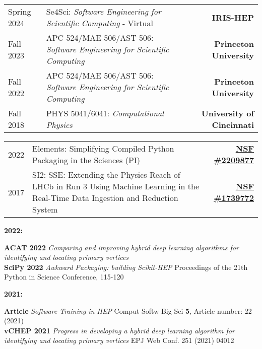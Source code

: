 \documentclass[10pt,letterpaper]{moderncv}
\begin{document}
\begin{tabularx}{\textwidth}{p{.8in}X>{\bfseries}r}
    Spring 2024 & Se4Sci: \textit{Software Engineering for Scientific Computing} - Virtual & IRIS-HEP \\
    Fall 2023 & APC 524/MAE 506/AST 506: \textit{Software Engineering for Scientific Computing} & Princeton University \\
    Fall 2022 & APC 524/MAE 506/AST 506: \textit{Software Engineering for Scientific Computing} & Princeton University \\
    Fall 2018 & PHYS 5041/6041: \textit{Computational Physics} & University of Cincinnati \\
\end{tabularx}

\begin{tabularx}{\textwidth}{p{.5in}X>{\bfseries}r}
    2022 & Elements: Simplifying Compiled Python Packaging in the Sciences (PI) & \href{https://nsf.gov/awardsearch/showAward?AWD_ID=NSF 2209877}{NSF \#2209877} \\
    2017 & SI2: SSE: Extending the Physics Reach of LHCb in Run 3 Using Machine Learning in the Real-Time Data Ingestion and Reduction System & \href{https://nsf.gov/awardsearch/showAward?AWD_ID=1739772}{NSF \#1739772} \\ %
\end{tabularx}


\begin{minipage}[t]{.065\textwidth}
\textbf{2022:}
\end{minipage}%
\begin{minipage}[t]{.935\textwidth}
\textbf{ACAT 2022} \emph{Comparing and improving hybrid deep learning algorithms for identifying and locating primary vertices} \\
\textbf{SciPy 2022} \emph{Awkward Packaging: building Scikit-HEP} Proceedings of the 21th Python in Science Conference, 115-120 \\
\end{minipage}

\begin{minipage}[t]{.065\textwidth}
\textbf{2021:}
\end{minipage}%
\begin{minipage}[t]{.935\textwidth}
\textbf{Article} \emph{Software Training in HEP} Comput Softw Big Sci \textbf{5}, Article number: 22 (2021) \\
\textbf{vCHEP 2021} \emph{Progress in developing a hybrid deep learning algorithm for identifying and locating primary vertices} EPJ Web Conf. 251 (2021) 04012
\end{minipage}
\end{document}
